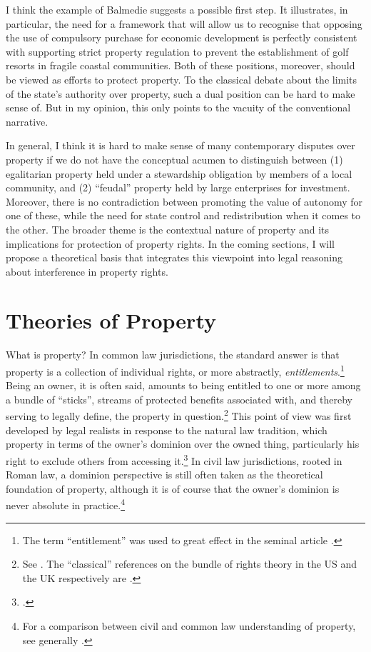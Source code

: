 I think the example of Balmedie suggests a possible first step. It illustrates, in particular, the need for a framework that will allow us to recognise that opposing the use of compulsory purchase for economic development is perfectly consistent with supporting strict property regulation to prevent the establishment of golf resorts in fragile coastal communities. Both of these positions, moreover, should be viewed as efforts to protect property. To the classical debate about the limits of the state's authority over property, such a dual position can be hard to make sense of. But in my opinion, this only points to the vacuity of the conventional narrative.

In general, I think it is hard to make sense of many contemporary disputes over property if we do not have the conceptual acumen to distinguish between (1) egalitarian property held under a stewardship obligation by members of a local community, and (2) ``feudal'' property held by large enterprises for investment. Moreover, there is no contradiction between promoting the value of autonomy for one of these, while  the need for state control and redistribution when it comes to the other. The broader theme is the contextual nature of property and its implications for protection of property rights. In the coming sections, I will propose a theoretical basis that integrates this viewpoint into legal reasoning about interference in property rights.

\section{Theories of Property}\label{sec:top}

What is property? In common law jurisdictions, the standard answer is that property is a collection of individual rights, or more abstractly, {\it entitlements}.\footnote{The term ``entitlement'' was used to great effect in the seminal article \cite{calabresi72}.} Being an owner, it is often said, amounts to being entitled to one or more among a bundle of ``sticks'', streams of protected benefits associated with, and thereby serving to legally define, the property in question.\footnote{See \cite[357-358]{merrill01}. The ``classical'' references on the bundle of rights theory in the US and the UK respectively are \cite{hohfeld17,honore61}.} This point of view was first developed by legal realists in response to the natural law tradition, which  property in terms of the owner's dominion over the owned thing, particularly his right to exclude others from accessing it.\footcite[193-195]{klein11} In civil law jurisdictions, rooted in Roman law, a dominion perspective is still often taken as the theoretical foundation of property, although it is of course  that the owner's dominion is never absolute in practice.\footnote{For a comparison between civil and common law understanding of property, see generally \cite{chang12}.}

